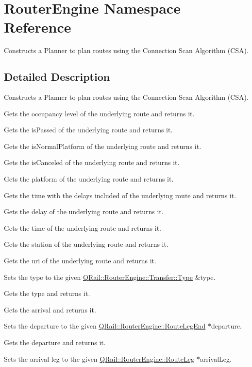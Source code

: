 \hypertarget{namespaceRouterEngine}{}\section{Router\+Engine Namespace Reference}
\label{namespaceRouterEngine}


Constructs a Planner to plan routes using the Connection Scan Algorithm (C\+SA).  




\subsection{Detailed Description}
Constructs a Planner to plan routes using the Connection Scan Algorithm (C\+SA). 

Gets the occupancy level of the underlying route and returns it.

Gets the is\+Passed of the underlying route and returns it.

Gets the is\+Normal\+Platform of the underlying route and returns it.

Gets the is\+Canceled of the underlying route and returns it.

Gets the platform of the underlying route and returns it.

Gets the time with the delays included of the underlying route and returns it.

Gets the delay of the underlying route and returns it.

Gets the time of the underlying route and returns it.

Gets the station of the underlying route and returns it.

Gets the uri of the underlying route and returns it.

Sets the type to the given \mbox{\hyperlink{classQRail_1_1RouterEngine_1_1Transfer_a5a0b372acbdfb9381fb937bf163edfa6}{Q\+Rail\+::\+Router\+Engine\+::\+Transfer\+::\+Type}} \&type.

Gets the type and returns it.

Gets the arrival and returns it.

Sets the departure to the given \mbox{\hyperlink{classQRail_1_1RouterEngine_1_1RouteLegEnd}{Q\+Rail\+::\+Router\+Engine\+::\+Route\+Leg\+End}} $\ast$departure.

Gets the departure and returns it.

Sets the arrival leg to the given \mbox{\hyperlink{classQRail_1_1RouterEngine_1_1RouteLeg}{Q\+Rail\+::\+Router\+Engine\+::\+Route\+Leg}} $\ast$arrival\+Leg.

